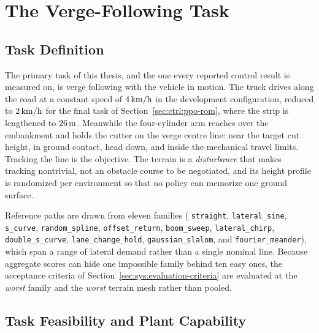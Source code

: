 \section{The Verge-Following Task}
\label{sec:sys:task}

\subsection{Task Definition}

The primary task of this thesis, and the one every reported control
result is measured on, is verge following with the vehicle in motion.
The truck drives along the road at a constant speed of $\unit[4]{km/h}$
in the development configuration, reduced to $\unit[2]{km/h}$ for the
final \ppoROM{} task of Section~\ref{sec:ctrl:ppo-rom}, where the strip
is lengthened to $\unit[26]{m}$. Meanwhile the
four-cylinder arm reaches over the embankment and holds the cutter on
the verge centre line: near the target cut height, in ground contact,
head down, and inside the mechanical travel limits. Tracking the line is
the objective. The terrain is a \emph{disturbance} that makes tracking
nontrivial, not an obstacle course to be negotiated, and its height
profile is randomized per environment so that no policy can memorize one
ground surface.

Reference paths are drawn from eleven families ( \texttt{straight},
\texttt{lateral\_sine}, \texttt{s\_curve}, \texttt{random\_spline},
\texttt{offset\_return}, \texttt{boom\_sweep}, \texttt{lateral\_chirp},
\texttt{double\_s\_curve}, \texttt{lane\_change\_hold},
\texttt{gaussian\_slalom}, and \texttt{fourier\_meander}),
which span
a range of lateral demand rather than a single nominal line. Because
aggregate scores can hide one impossible family behind ten easy ones,
the acceptance criteria of
Section~\ref{sec:sys:evaluation-criteria} are evaluated at the
\emph{worst} family and the \emph{worst} terrain mesh rather than pooled.

\subsection{Task Feasibility and Plant Capability}
\label{sec:sys:capability}

